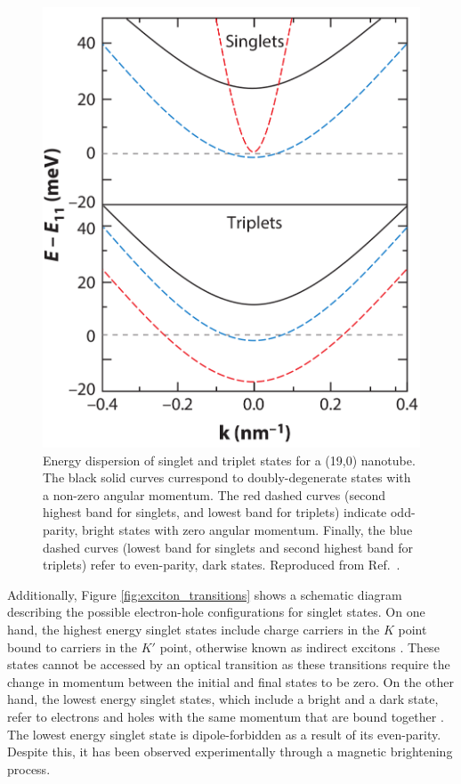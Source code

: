 \begin{figure}[ht]
	\centering
	\includegraphics[scale=0.25]{images/chapter_optical_props/dark_and_bright_excitons}
	\caption{Energy dispersion of singlet and triplet states for a (19,0) nanotube. The black solid curves currespond to doubly-degenerate states with a non-zero angular momentum. The red dashed curves (second highest band for singlets, and lowest band for triplets) indicate odd-parity, bright states with zero angular momentum. Finally, the blue dashed curves (lowest band for singlets and second highest band for triplets) refer to even-parity, dark states. Reproduced from Ref.\ \cite{amori2018excitons}.}
	\label{fig:dark_bright_excitons_dispersion}
\end{figure}

Additionally, Figure \ref{fig:exciton_transitions} shows a schematic diagram describing the possible electron-hole configurations for singlet states. On one hand, the highest energy singlet states include charge carriers in the $K$ point bound to carriers in the $K'$ point, otherwise known as indirect excitons \cite{srivastava2008direct}. These states cannot be accessed by an optical transition as these transitions require the change in momentum between the initial and final states to be zero. On the other hand, the lowest energy singlet states, which include a bright and a dark state, refer to electrons and holes with the same momentum that are bound together \cite{srivastava2008direct}. The lowest energy singlet state is dipole-forbidden as a result of its even-parity. Despite this, it has been observed experimentally through a magnetic brightening process.

